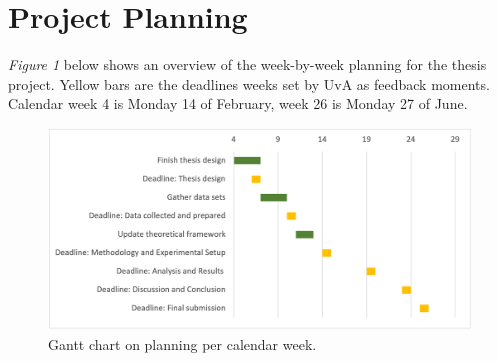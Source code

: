 \documentclass[sigconf]{acmart}
\begin{document}
\section{Project Planning}

\emph{Figure 1} below shows an overview of the week-by-week planning for the thesis project. Yellow bars are the deadlines weeks set by UvA as feedback moments. Calendar week 4 is Monday 14 of February, week 26 is Monday 27 of June. 

\begin{figure}[h]
  \centering
  \includegraphics[width=\linewidth]{gantt-planning}
  \caption{Gantt chart on planning per calendar week.}
\end{figure}








\appendix
\end{document}
